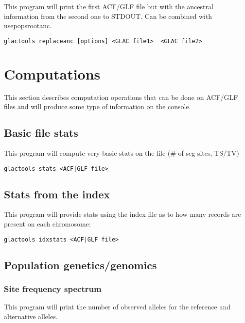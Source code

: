 \documentclass[a4paper]{article}
\begin{document}
\noindent This program will print the first ACF/GLF file but with the ancestral information from the second one to STDOUT. Can be combined with usepopsrootanc.

\begin{lstlisting}
glactools replaceanc [options] <GLAC file1>  <GLAC file2>
\end{lstlisting}




\newpage

\section{Computations}

This section describes computation operations that can be done on ACF/GLF files and will produce some type of information on the console.



\subsection{Basic file stats}

 This program will compute very basic stats on the file (\# of seg sites, TS/TV)

\begin{lstlisting}
glactools stats <ACF|GLF file>
\end{lstlisting}


\subsection{Stats from the index}

\noindent This program will provide stats using the index file as to how many records are present on each chromosome:

\begin{lstlisting}
glactools idxstats <ACF|GLF file>
\end{lstlisting}


\subsection{Population genetics/genomics}

\subsubsection{Site frequency spectrum}

This program will print the number of observed alleles for the reference and alternative alleles.
\end{document}
